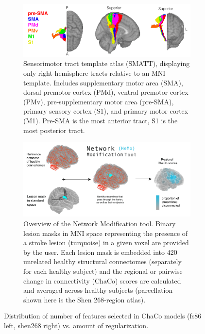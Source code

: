 \documentclass[10pt]{article}
\begin{document}
\begin{figure}
\begin{subfigure}{1\textwidth}
   \includegraphics[width=1\linewidth]{figures/SMATT.png}
    \caption{Sensorimotor tract template atlas (SMATT), displaying only right hemisphere tracts relative to an MNI template. Includes supplementary motor area (SMA), dorsal premotor cortex (PMd), ventral premotor cortex (PMv), pre-supplementary motor area (pre-SMA), primary sensory cortex (S1),  and primary motor cortex (M1). Pre-SMA is the most anterior tract, S1 is the most posterior tract.}
    \label{smatt}
  \label{fig:sfig1}
\end{subfigure}
\begin{subfigure}{1\textwidth}
  \includegraphics[width=1\linewidth]{figures/Multi-panelML_white_regional.png}
  \caption{Overview of the Network Modification tool. Binary lesion masks in MNI space representing the presence of a stroke lesion (turquoise) in a given voxel are provided by the user. Each lesion mask is embedded into 420 unrelated healthy structural connectomes (separately for each healthy subject) and the regional or pairwise change in connectivity (ChaCo) scores are calculated and averaged across healthy subjects (parcellation shown here is the Shen 268-region atlas). }
  \label{fig:sfig2}
\end{subfigure}
\caption{Distribution of number of features selected in ChaCo models (fs86 left, shen268 right) vs. amount of regularization.}
\label{smatt_and_chaco}
\end{figure}
\end{document}
